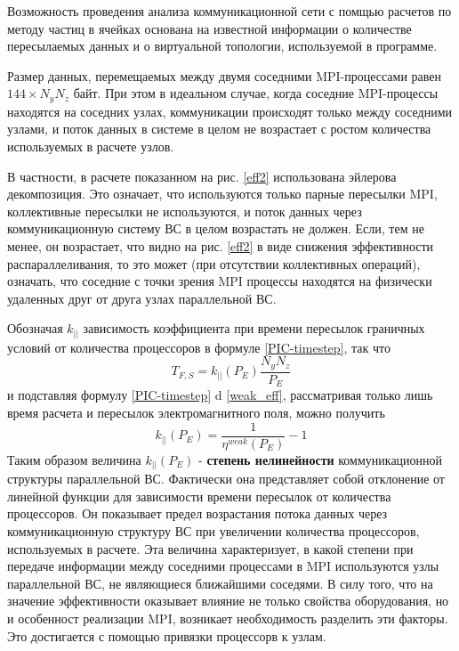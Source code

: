 		Возможность проведения анализа коммуникационной сети с помщью расчетов по методу частиц в ячейках основана на известной информации о количестве пересылаемых данных и о виртуальной топологии, используемой в программе.
		
		Размер данных, перемещаемых между двумя соседними MPI-процессами равен $144 \times N_y N_z  $ байт. При этом в идеальном случае, когда соседние MPI-процессы находятся на соседних узлах, коммуникации происходят только между соседними узлами, и поток данных в системе в целом не возрастает с ростом количества используемых в расчете узлов.
		
		В частности, в расчете показанном на рис. \ref{eff2} использована эйлерова декомпозиция. Это означает, что используются только парные пересылки MPI, коллективные пересылки не используются, и поток данных через коммуникационную систему ВС в целом возрастать не должен. Если, тем не менее, он возрастает, что видно на рис. \ref{eff2} в виде снижения эффективности распараллеливания, то это может (при отсутствии коллективных операций), означать, что соседние с точки зрения MPI процессы находятся на физически удаленных друг от друга узлах параллельной ВС.
		
		Обозначая $k_{||}$ зависимость коэффициента при времени пересылок граничных условий от количества процессоров в формуле \ref{PIC-timestep}, так что 
		\begin{equation}
		T_{F,S} = k_{||} (P_E) \frac{N_y N_z}{P_E}
		\end{equation} 
		и подставляя формулу \ref{PIC-timestep} d \ref{weak_eff}, рассматривая только лишь время расчета и пересылок электромагнитного поля, можно получить 
		\begin{equation}
		k_{||} (P_E) = \frac{1}{\eta^{weak}(P_E)} - 1
		\end{equation}	  
		Таким образом величина $k_{||} (P_E)$  - \textbf{степень нелинейности} коммуникационной структуры параллельной ВС. Фактически она представляет собой отклонение от линейной функции для зависимости времени пересылок от количества процессоров. Он показывает предел возрастания потока данных через коммуникационную структуру ВС при увеличении количества процессоров, используемых в расчете. Эта величина характеризует, в какой степени при передаче информации между соседними процессами в MPI используются узлы параллельной ВС, не являющиеся ближайшими соседями. В силу того, что на значение эффективности оказывает влияние не только свойства оборудования, но и особенност реализации MPI, возникает необходимость разделить эти факторы. Это достигается с помощью привязки процессорв к узлам. 
		
